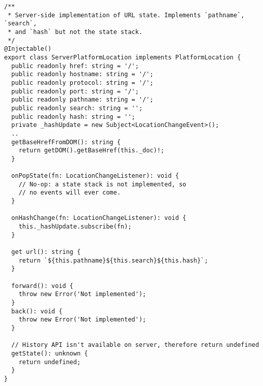 \begin{verbatim}
/**
 * Server-side implementation of URL state. Implements `pathname`, `search`,
 * and `hash` but not the state stack.
 */
@Injectable()
export class ServerPlatformLocation implements PlatformLocation {
  public readonly href: string = '/';
  public readonly hostname: string = '/';
  public readonly protocol: string = '/';
  public readonly port: string = '/';
  public readonly pathname: string = '/';
  public readonly search: string = '';
  public readonly hash: string = '';
  private _hashUpdate = new Subject<LocationChangeEvent>();
  ..
  getBaseHrefFromDOM(): string {
    return getDOM().getBaseHref(this._doc)!;
  }

  onPopState(fn: LocationChangeListener): void {
    // No-op: a state stack is not implemented, so
    // no events will ever come.
  }

  onHashChange(fn: LocationChangeListener): void {
    this._hashUpdate.subscribe(fn);
  }

  get url(): string {
    return `${this.pathname}${this.search}${this.hash}`;
  }

  forward(): void {
    throw new Error('Not implemented');
  }
  back(): void {
    throw new Error('Not implemented');
  }

  // History API isn't available on server, therefore return undefined
  getState(): unknown {
    return undefined;
  }
}
\end{verbatim}
